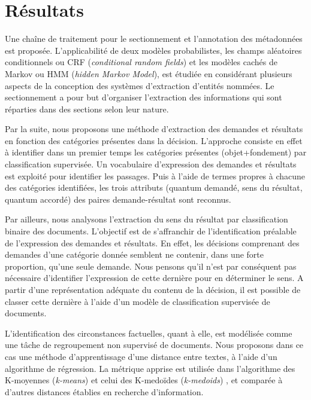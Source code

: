 \section{Résultats}
\label{sec:intro:résultats}
Une chaîne de traitement pour le sectionnement et l'annotation des métadonnées est proposée. L'applicabilité de deux modèles probabilistes, les champs aléatoires conditionnels ou CRF (\textit{conditional random fields}) et les modèles cachés de Markov ou HMM (\textit{hidden Markov Model}), est étudiée en considérant plusieurs aspects de la conception des systèmes d'extraction d'entités nommées. Le sectionnement a pour but d'organiser l'extraction des informations qui sont réparties dans des sections selon leur nature. 

Par la suite, nous proposons une méthode d'extraction des demandes et résultats en fonction des catégories présentes dans la décision. L'approche consiste en effet à identifier dans un premier temps les catégories présentes (objet+fondement) par classification supervisée. Un vocabulaire d'expression des demandes et résultats est exploité pour identifier les passages. Puis à l'aide de termes propres à chacune des catégories identifiées, les trois attributs (quantum demandé, sens du résultat, quantum accordé) des paires demande-résultat sont reconnus. 

Par ailleurs, nous analysons l'extraction du sens du résultat par classification binaire des documents. L'objectif est de s'affranchir de l'identification préalable de l'expression des demandes et résultats. En effet, les décisions comprenant des demandes d'une catégorie donnée semblent ne contenir, dans une forte proportion, qu'une seule demande. Nous pensons qu'il n'est par conséquent pas nécessaire d'identifier l'expression de cette dernière pour en déterminer le sens. A partir d'une représentation adéquate du contenu de la décision, il est possible de classer cette dernière à l'aide d'un modèle de classification supervisée de documents.

L'identification des circonstances factuelles, quant à elle, est modélisée comme une tâche de regroupement non supervisé de documents. Nous proposons dans ce cas une méthode d'apprentissage d'une distance entre textes, à l'aide d'un algorithme de régression. La métrique apprise est utilisée dans l'algorithme des \og K-moyennes \fg{} (\textit{k-means}) \citep{forgey1965kmeans} et celui des \og K-medoïdes \fg{} (\textit{k-medoids}) \citep{kaufman1987kmedoids}, et comparée à d'autres distances établies en recherche d'information.

